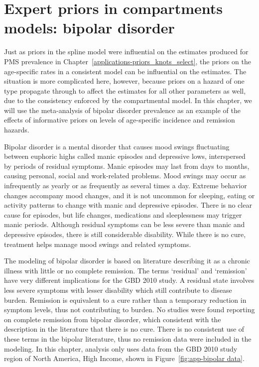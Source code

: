 \chapter{Expert priors in compartments models: bipolar disorder}
\label{applications-prior_level_vals}

Just as priors in the spline model were influential on the estimates
produced for PMS prevalence in
Chapter~\ref{applications-priors_knots_select}, the priors on the
age-specific rates in a consistent model can be influential on the
estimates.  The situation is more complicated here, however, because
priors on a hazard of one type propagate through to affect the
estimates for all other parameters as well, due to the consistency
enforced by the compartmental model.  In this chapter, we will use the
meta-analysis of bipolar disorder prevalence as an example of the
effects of informative priors on levels of age-specific incidence and
remission hazards.

Bipolar disorder is a mental disorder that causes mood swings
fluctuating between euphoric highs called manic episodes and
depressive lows, interspersed by periods of residual symptoms.  Manic
episodes may last from days to months, causing personal, social and
work-related problems.  Mood swings may occur as infrequently as
yearly or as frequently as several times a day.  Extreme behavior
changes accompany mood changes, and it is not uncommon for sleeping,
eating or activity patterns to change with manic and depressive
episodes.  There is no clear cause for episodes, but life changes,
medications and sleeplessness may trigger manic periods.
Although residual symptoms can be less severe than manic
and depressive episodes, there is still considerable disability.  While there
is no cure, treatment helps manage mood swings and related
symptoms. \cite{kloos_bipolar_2011, angst_historical_2000}

The modeling of bipolar disorder is based on literature describing it
as a chronic illness with little or no complete remission.
The terms `residual' and `remission' have very different implications
for the GBD 2010 study.  A residual state involves less severe
symptoms with lesser disability which still contribute to disease
burden.  Remission is equivalent to a cure rather than a temporary
reduction in symptom levels, thus not contributing to burden.  No studies
were found reporting on complete remission from bipolar disorder,
which consistent with the description in the literature that there
is no cure. \cite{association_diagnostic_2000}
There is no consistent use of these terms in the bipolar literature, thus
no remission data were included in the modeling.  In this chapter, analysis
only uses data from the GBD 2010 study region of North America, High Income,
shown in Figure~\ref{fig:app-bipolar data}.


